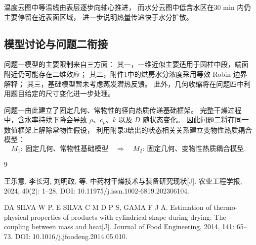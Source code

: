 \documentclass[UTF8,a4paper,11pt]{ctexart}
\begin{document}
温度云图中等温线由表层逐步向轴心推进，
而水分云图中低含水区在30 min 内仍主要停留在近表面区域，
进一步说明热量传递快于水分扩散。

\subsection{模型讨论与问题二衔接}

问题一模型的主要限制来自三方面：
其一，一维近似主要适用于圆柱中段，端面附近仍可能存在二维效应；
其二，附件1中的烘房水分浓度采用等效 Robin 边界解释；
其三，基础模型暂未考虑蒸发潜热反馈。
此外，几何收缩将在问题四中利用题目给定的尺寸变化进一步处理。

问题一由此建立了固定几何、常物性的径向热质传递基础框架。
完整干燥过程中，含水率持续下降会导致
$\rho$、$c_p$、$k$ 以及 $D$ 随状态变化。
因此问题二将在同一数值框架上解除常物性假设，
利用附录3给出的状态相关关系建立变物性热质耦合模型：
\[
\boxed{
M_1:\ \text{固定几何、常物性基础模型}
}
\quad\Longrightarrow\quad
\boxed{
M_2:\ \text{固定几何、变物性热质耦合模型}
}.
\]

\begin{thebibliography}{9}

王乐意, 李长河, 刘明政, 等.
中药材干燥技术与装备研究现状[J].
农业工程学报, 2024, 40(2): 1--28.
DOI: 10.11975/j.issn.1002-6819.202306104.

DA SILVA W P, E SILVA C M D P S, GAMA F J A.
Estimation of thermo-physical properties of products with cylindrical shape during drying:
The coupling between mass and heat[J].
Journal of Food Engineering, 2014, 141: 65--73.
DOI: 10.1016/j.jfoodeng.2014.05.010.

\end{thebibliography}
\end{document}
